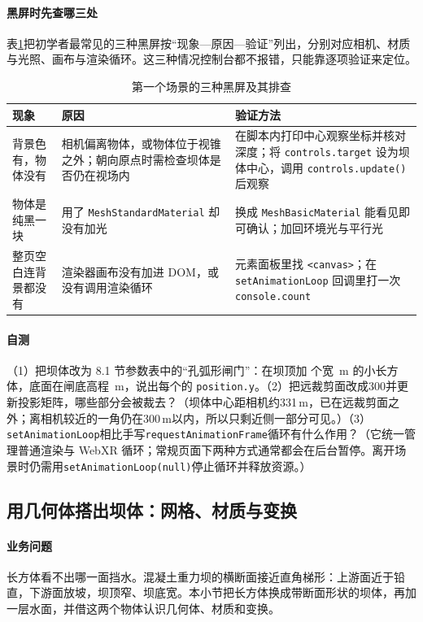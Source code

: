 \paragraph{黑屏时先查哪三处}表\ref{tab:ch06-first-scene-faults}把初学者最常见的三种黑屏按“现象—原因—验证”列出，分别对应相机、材质与光照、画布与渲染循环。这三种情况控制台都不报错，只能靠逐项验证来定位。

\begin{table}[htbp]
\centering
\caption{第一个场景的三种黑屏及其排查}
\label{tab:ch06-first-scene-faults}
\begin{tabular}{p{2.6cm}p{5.2cm}p{5.4cm}}
\toprule
现象 & 原因 & 验证方法 \\
\midrule
背景色有，物体没有 & 相机偏离物体，或物体位于视锥之外；朝向原点时需检查坝体是否仍在视场内 & 在脚本内打印中心观察坐标并核对深度；将 \texttt{controls.target} 设为坝体中心，调用 \texttt{controls.update()} 后观察 \\
物体是纯黑一块 & 用了 \texttt{MeshStandardMaterial} 却没有加光 & 换成 \texttt{MeshBasicMaterial} 能看见即可确认；加回环境光与平行光 \\
整页空白连背景都没有 & 渲染器画布没有加进 DOM，或没有调用渲染循环 & 元素面板里找 \texttt{<canvas>}；在 \texttt{setAnimationLoop} 回调里打一次 \texttt{console.count} \\
\bottomrule
\end{tabular}
\end{table}

\paragraph{自测}（1）把坝体改为 8.1 节参数表中的“\cpGateCount 孔弧形闸门”：在坝顶加 \cpGateCount 个宽 \cpGateWidth\,m 的小长方体，底面在闸底高程 \cpGateSillElev\,m，说出每个的 \texttt{position.y}。（2）把远裁剪面改成300并更新投影矩阵，哪些部分会被裁去？（坝体中心距相机约331\,m，已在远裁剪面之外；离相机较近的一角仍在300\,m以内，所以只剩近侧一部分可见。）（3）\texttt{setAnimationLoop}相比手写\texttt{requestAnimationFrame}循环有什么作用？（它统一管理普通渲染与 WebXR 循环；常规页面下两种方式通常都会在后台暂停。离开场景时仍需用\texttt{setAnimationLoop(null)}停止循环并释放资源。）

\subsection{用几何体搭出坝体：网格、材质与变换}

\paragraph{业务问题}长方体看不出哪一面挡水。混凝土重力坝的横断面接近直角梯形：上游面近于铅直，下游面放坡，坝顶窄、坝底宽。本小节把长方体换成带断面形状的坝体，再加一层水面，并借这两个物体认识几何体、材质和变换。

